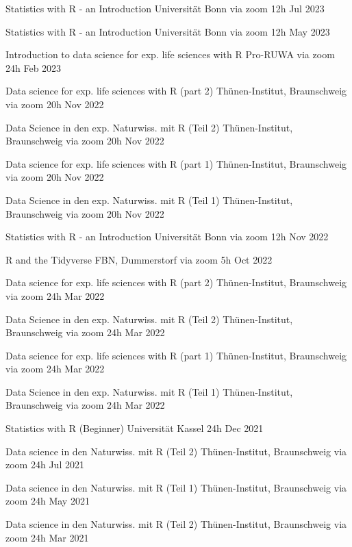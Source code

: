 \documentclass[11pt,a4paper,]{awesome-cv}
\begin{document}
\begin{cvhonors} 
\cvhonor
{Statistics with R - an Introduction  }
{Universität Bonn via zoom}
{12h}
{Jul 2023  }

\cvhonor
{Statistics with R - an Introduction  }
{Universität Bonn via zoom}
{12h}
{May 2023  }

\cvhonor
{Introduction to data science for exp. life sciences with R  }
{Pro-RUWA via zoom}
{24h}
{Feb 2023  }

\cvhonor
{Data science for exp. life sciences with R (part 2)  }
{Thünen-Institut, Braunschweig via zoom}
{20h}
{Nov 2022  }

\cvhonor
{Data Science in den exp. Naturwiss. mit R (Teil 2)  }
{Thünen-Institut, Braunschweig via zoom}
{20h}
{Nov 2022  }

\cvhonor
{Data science for exp. life sciences with R (part 1)  }
{Thünen-Institut, Braunschweig via zoom}
{20h}
{Nov 2022  }

\cvhonor
{Data Science in den exp. Naturwiss. mit R (Teil 1)  }
{Thünen-Institut, Braunschweig via zoom}
{20h}
{Nov 2022  }

\cvhonor
{Statistics with R - an Introduction  }
{Universität Bonn via zoom}
{12h}
{Nov 2022  }

\cvhonor
{R and the {Tidyverse}  }
{FBN, Dummerstorf via zoom}
{5h}
{Oct 2022  }

\cvhonor
{Data science for exp. life sciences with R (part 2)  }
{Thünen-Institut, Braunschweig via zoom}
{24h}
{Mar 2022  }

\cvhonor
{Data Science in den exp. Naturwiss. mit R (Teil 2)  }
{Thünen-Institut, Braunschweig via zoom}
{24h}
{Mar 2022  }

\cvhonor
{Data science for exp. life sciences with R (part 1)  }
{Thünen-Institut, Braunschweig via zoom}
{24h}
{Mar 2022  }

\cvhonor
{Data Science in den exp. Naturwiss. mit R (Teil 1)  }
{Thünen-Institut, Braunschweig via zoom}
{24h}
{Mar 2022  }

\cvhonor
{Statistics with R (Beginner)  }
{Universität Kassel}
{24h}
{Dec 2021  }

\cvhonor
{Data science in den Naturwiss. mit R (Teil 2)  }
{Thünen-Institut, Braunschweig via zoom}
{24h}
{Jul 2021  }

\cvhonor
{Data science in den Naturwiss. mit R (Teil 1)  }
{Thünen-Institut, Braunschweig via zoom}
{24h}
{May 2021  }

\cvhonor
{Data science in den Naturwiss. mit R (Teil 2)  }
{Thünen-Institut, Braunschweig via zoom}
{24h}
{Mar 2021  }


\end{cvhonors}
\end{document}
